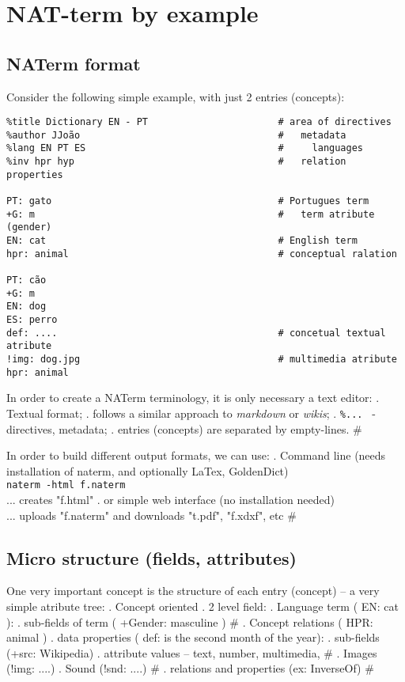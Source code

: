 \documentclass{ceurart}
\begin{document}
\section{NAT-term by example} 

\subsection{NATerm format}

Consider the following simple example, with just 2 entries (concepts):

\begin{Verbatim}
%title Dictionary EN - PT                       # area of directives
%author JJoão                                   #   metadata
%lang EN PT ES                                  #     languages     
%inv hpr hyp                                    #   relation properties

PT: gato                                        # Portugues term
+G: m                                           #   term atribute (gender)
EN: cat                                         # English term
hpr: animal                                     # conceptual ralation

PT: cão
+G: m
EN: dog
ES: perro
def: ....                                       # concetual textual atribute
!img: dog.jpg                                   # multimedia atribute
hpr: animal
\end{Verbatim}


In order to create a NATerm terminology, it is only necessary a
text editor:
   . Textual format;
   . follows a similar approach to \emph{markdown} or \emph{wikis};
   . \verb!%... ! - directives, metadata;
   . entries (concepts) are separated by empty-lines.
   #


In order to build different output formats, we can use:
. Command line (needs installation of naterm, and optionally LaTex, GoldenDict)
  \\ \texttt{naterm -html f.naterm}
  \\ ... creates "f.html"
. or simple web interface (no installation needed)
  \\ ... uploads "f.naterm" and downloads "t.pdf", "f.xdxf", etc
#

\subsection{Micro structure (fields, attributes)}

One very important concept is the structure of each entry (concept) --
a very simple atribute tree:
  .  Concept oriented
  .  2 level field:
     .  Language term ( EN: cat ):
        .  sub-fields of term ( +Gender: masculine )
     #
     .  Concept relations ( HPR: animal )
     .  data properties ( def: is the second month of the year):
        .  sub-fields (+src: Wikipedia)
        .  attribute values -- text, number, multimedia,
     #
     . Images (!img: ....)
     . Sound (!snd: ....)
  #
  .  relations and properties (ex: InverseOf)
#
\end{document}
